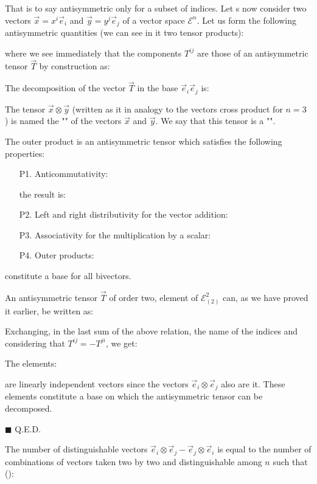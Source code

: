 	That is to say antisymmetric only for a subset of indices.
	Let s now consider two vectors $\vec{x}=x^i\vec{e}_i$ and $\vec{y}=y^j\vec{e}_j$ of a vector space $\mathcal{E}^n$. Let us form the following antisymmetric quantities (we can see in it two tensor products):
	
	where we see immediately that the components $T^{ij}$ are those of an antisymmetric tensor $\vec{T}$ by construction as:
	
	The decomposition of the vector $\vec{T}$ in the base $\vec{e}_i\vec{e}_j$ is:
	
	The tensor $\vec{x}\otimes\vec{y}$ (written as it in analogy to the vectors cross product for $n=3$ ) is named the "" of the vectors $\vec{x}$ and $\vec{y}$. We say that this tensor is a "".
	
	The outer product is an antisymmetric tensor which satisfies the following properties:
	\begin{enumerate}
		\item[P1.] Anticommutativity:
		
		the result is:
		

		\item[P2.] Left and right distributivity for the vector addition:
		

		\item[P3.] Associativity for the multiplication by a scalar:
		

		\item[P4.] Outer products:
		
	\end{enumerate}
	constitute a base for all bivectors.
	\begin{dem}
	An antisymmetric tensor $\vec{T}$ of order two, element of $\mathcal{E}_{(2)}^2$ can, as we have proved it earlier, be written as:
	
	Exchanging, in the last sum of the above relation, the name of the indices and considering that $T^{ij}=-T^{ji}$, we get:
	
	The elements:
	
	are linearly independent vectors since the vectors $\vec{e}_i\otimes\vec{e}_j$ also are it. These elements constitute a base on which the antisymmetric tensor can be decomposed.
	\begin{flushright}
		$\blacksquare$  Q.E.D.
	\end{flushright}
	\end{dem}
	The number of distinguishable vectors $\vec{e}_i\otimes\vec{e}_j-\vec{e}_j\otimes\vec{e}_i$ is equal to the number of combinations of vectors taken two by two and distinguishable among $n$ such that ():
	
